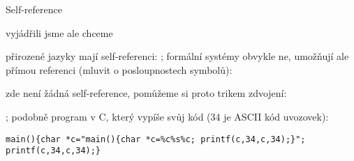 \documentclass{beamer}
\begin{document}
\begin{frame}[fragile]{Self-reference}

    \pause
    \vspace{-6pt}
    vyjádřili jsme  ale chceme 
    
    \pause
    přirozené jazyky mají self-referenci:
    ;  
    formální systémy obvykle ne, umožňují ale \alert{přímou referenci} (mluvit o posloupnostech symbolů):
    
    \medskip

    \pause

    \medskip

    \pause
    zde není žádná self-reference, pomůžeme si proto trikem \alert{zdvojení}:
    
    \medskip

    \pause

    \medskip

    \pause
    ; \pause podobně program v C, který vypíše svůj kód (34 je ASCII kód uvozovek): 

    \vspace{-6pt}
    {\small
    \begin{verbatim}
main(){char *c="main(){char *c=%c%s%c; printf(c,34,c,34);}"; 
printf(c,34,c,34);}  
    \end{verbatim}
    }    

\end{frame}
\end{document}
